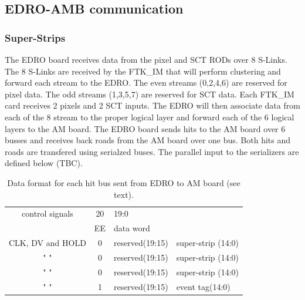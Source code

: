 \documentclass[10pt]{article}
\numberwithin{figure}{section}
\numberwithin{equation}{section}
\numberwithin{table}{section}
\newcommand{\0}{\phantom{0}}
\begin{document}
\newpage
\subsection{EDRO-AMB communication}
\label{EDRO_AMB}

\subsubsection{Super-Strips}

The EDRO board receives data from the pixel and SCT RODs over 8 S-Links.
The 8 S-Links are received by the FTK\_IM that will perform clustering and forward each stream to the EDRO.
The even streams (0,2,4,6) are reserved for pixel data. The odd streams (1,3,5,7) are reserved for SCT data.
Each FTK\_IM card receives 2 pixels and 2 SCT inputs.
The EDRO will then associate data from each of the 8 stream to the proper logical layer and forward each of the 6 logical layers to the AM board.
The EDRO board sends hits to the AM board over 6 busses and receives back roads from the AM board over one bus.
Both hits and roads are transfered using serialzed buses. The parallel input to the serializers are defined below (TBC). 


\begin{table}[h]
\begin{tabular}{c|c|c|l}
control signals & 20 & \multicolumn{2}{l}{19:0}    \\
 & EE &  \multicolumn{2}{l}{data word}    \\ \hline \hline
{\tiny CLK, DV and HOLD}   & 0 &  reserved(19:15) & super-strip (14:0) \\ \hline
 "   "  & 0 &  reserved(19:15) & super-strip (14:0) \\ \hline
 "   "  & 0 &  reserved(19:15) & super-strip (14:0) \\ \hline
 "   "  & 1 &  reserved(19:15) & event tag(14:0) \\ \hline
\end{tabular}
\caption{\label{tab:EDRO_AM_hits}Data format for each hit bus sent from EDRO to AM board (see text).}
\end{table}
\end{document}
